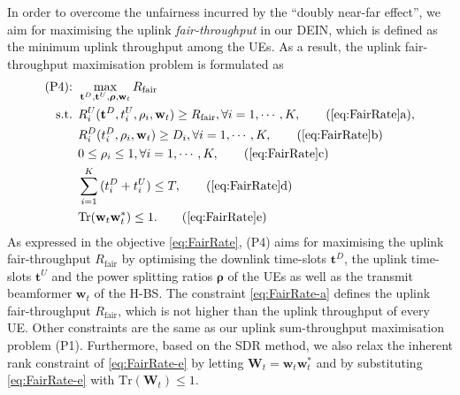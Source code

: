 \documentclass[12pt,draft,onecolumn,journal]{IEEEtran}
\begin{document}
In order to overcome the unfairness incurred by the ``doubly near-far effect'', we aim for maximising the uplink \textit{fair-throughput} in our DEIN, which is defined as the minimum uplink throughput among the UEs. As a result, the uplink fair-throughput maximisation problem is formulated as
\begin{align}
	\text{(P4): } & \max_{\mathbf{t}^D, \mathbf{t}^U, \boldsymbol{\rho}, \mathbf{w}_t} R_{\text{fair}} \label{eq:FairRate} \\
	\text{s.t. } & R_i^U(\mathbf{t}^D,t_i^U,\rho_i,\mathbf{w}_t) \geq R_{\text{fair}}, \forall i = 1,\cdots,K, \tag{\ref{eq:FairRate}a}, \label{eq:FairRate-a}\\
	& R_i^D(t_i^D,\rho_i, \mathbf{w}_t) \geq D_i, \forall i=1,\cdots,K, \tag{\ref{eq:FairRate}b} \label{eq:FairRate-b} \\
	&0 \leq \rho_i \leq 1, \forall i=1,\cdots,K,\tag{\ref{eq:FairRate}c} \label{eq:FairRate-c} \\
	&\sum_{i=1}^{K}{(t_i^D+t_i^U)}\leq T, \tag{\ref{eq:FairRate}d} \label{eq:FairRate-d}\\
	&\text{Tr}(\mathbf{w}_t\mathbf{w}_t^*) \leq 1. \tag{\ref{eq:FairRate}e} \label{eq:FairRate-e}
\end{align}
As expressed in the objective \eqref{eq:FairRate}, (P4) aims for maximising the uplink fair-throughput $R_{\text{fair}}$ by optimising the downlink time-slots $\mathbf{t}^D$, the uplink time-slots $\mathbf{t}^{U}$ and the power splitting ratios $\boldsymbol{\rho}$ of the UEs as well as the transmit beamformer $\mathbf{w}_t$ of the H-BS. The constraint \eqref{eq:FairRate-a} defines the uplink fair-throughput $R_{\text{fair}}$, which is not higher than the uplink throughput of every UE. Other constraints are the same as our uplink sum-throughput maximisation problem (P1). Furthermore, based on the SDR method, we also relax the inherent rank constraint of \eqref{eq:FairRate-e} by letting $\mathbf{W}_t = \mathbf{w}_t\mathbf{w}_t^*$ and by substituting \eqref{eq:FairRate-e} with $\text{Tr}(\mathbf{W}_t) \leq 1$.
\end{document}
